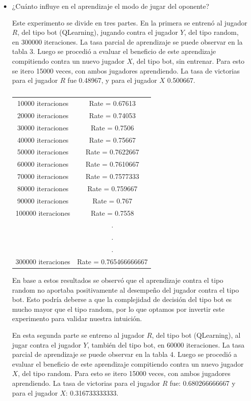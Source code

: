 \documentclass[10pt,a4paper]{article}
\begin{document}
\begin{itemize}
		
\item ¿Cuánto influye en el aprendizaje el modo de jugar del oponente?

	Este experimento se divide en tres partes. En la primera se entrenó al jugador $R$, del tipo bot (QLearning), jugando contra el jugador $Y$, del tipo random, en 300000 iteraciones. La tasa parcial de aprendizaje se puede observar en la tabla 3. Luego se procedió a evaluar el beneficio de este aprendizaje compitiendo contra un nuevo jugador $X$, del tipo bot, sin entrenar. Para esto se itero 15000 veces, con ambos jugadores aprendiendo. La tasa de victorias para el jugador $R$ fue 0.48967, y para el jugador $X$ 0.500667.
    
	\begin{table}[H]
    \centering
	\begin{tabular}{c c}
       10000 iteraciones & Rate =  0.67613 \\
       20000 iteraciones & Rate =  0.74053\\
       30000 iteraciones &  Rate =  0.7506 \\
       40000 iteraciones &  Rate =  0.75667 \\
       50000 iteraciones &  Rate =  0.7622667 \\
       60000 iteraciones &  Rate =  0.7610667 \\
	     70000 iteraciones &  Rate =  0.7577333 \\
       80000 iteraciones &  Rate =  0.759667\\
       90000 iteraciones &  Rate =  0.767 \\
       100000 iteraciones & Rate =  0.7558 \\
				& . \\
				& . \\
				& . \\
       300000 iteraciones & Rate = 0.765466666667

	\end{tabular}
	\caption{}
	\end{table}

En base a estos resultados se observó que el aprendizaje contra el tipo random no aportaba positivamente al desempeño del jugador contra el tipo bot. Esto podría deberse a que la complejidad de decisión del tipo bot es mucho mayor que el tipo random, por lo que optamos por invertir este experimento para validar nuestra intuición.

En esta segunda parte se entreno al jugador $R$, del tipo bot (QLearning), al jugar contra el jugador $Y$, también del tipo bot, en 60000 iteraciones. La tasa parcial de aprendizaje se puede observar en la tabla 4. Luego se procedió a evaluar el beneficio de este aprendizaje compitiendo contra un nuevo jugador $X$, del tipo random. Para esto se itero 15000 veces, con ambos jugadores aprendiendo. La tasa de victorias para el jugador $R$ fue: 0.680266666667 y para el jugador $X$: 0.316733333333.


\end{itemize}
\end{document}
